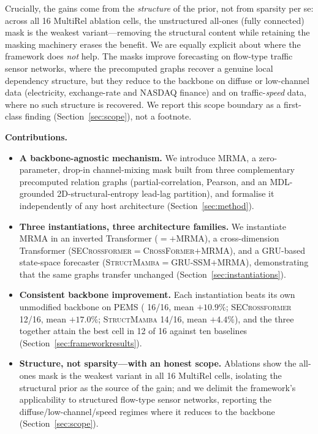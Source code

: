 Crucially, the gains come from the \emph{structure} of the prior, not from
sparsity per se: across all 16 MultiRel ablation cells, the unstructured
all-ones (fully connected) mask is the weakest variant---removing the structural
content while retaining the masking machinery erases the benefit.
We are equally explicit about where the framework does \emph{not} help.
The masks improve forecasting on flow-type traffic sensor networks, where the
precomputed graphs recover a genuine local dependency structure, but they reduce
to the backbone on diffuse or low-channel data (electricity, exchange-rate and
NASDAQ finance) and on traffic-\emph{speed} data, where no such structure is
recovered.
We report this scope boundary as a first-class finding
(Section~\ref{sec:scope}), not a footnote.

\medskip
\noindent\textbf{Contributions.}
\begin{itemize}
  \item \textbf{A backbone-agnostic mechanism.} We introduce MRMA, a
        zero-parameter, drop-in channel-mixing mask built from three
        complementary precomputed relation graphs (partial-correlation, Pearson,
        and an MDL-grounded 2D-structural-entropy lead-lag partition), and
        formalise it independently of any host architecture
        (Section~\ref{sec:method}).
  \item \textbf{Three instantiations, three architecture families.} We
        instantiate MRMA in an inverted Transformer (\mr{}${=}$\itrans{}${+}$MRMA),
        a cross-dimension Transformer
        (\textsc{SECrossformer}${=}$\textsc{CrossFormer}${+}$MRMA), and a
        GRU-based state-space forecaster
        (\textsc{StructMamba}${=}$GRU-SSM${+}$MRMA), demonstrating that the same
        graphs transfer unchanged (Section~\ref{sec:instantiations}).
  \item \textbf{Consistent backbone improvement.} Each instantiation beats its
        own unmodified backbone on PEMS (\mr{} 16/16, mean $+10.9\%$;
        \textsc{SECrossformer} 12/16, mean $+17.0\%$; \textsc{StructMamba}
        14/16, mean $+4.4\%$), and the three together attain the best cell in
        12 of 16 against ten baselines (Section~\ref{sec:frameworkresults}).
  \item \textbf{Structure, not sparsity---with an honest scope.} Ablations show
        the all-ones mask is the weakest variant in all 16 MultiRel cells,
        isolating the structural prior as the source of the gain; and we
        delimit the framework's applicability to structured flow-type sensor
        networks, reporting the diffuse/low-channel/speed regimes where it
        reduces to the backbone (Section~\ref{sec:scope}).
\end{itemize}
